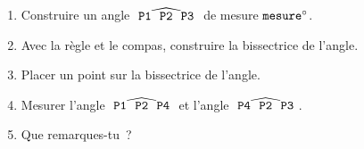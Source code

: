 \documentclass[exercice]{thedocument}%
\begin{document}
%
    \begin{enumerate}
        \item Construire un angle $\widehat{\mathspoint{\<P1;\<P2;\<P3;}}$ de mesure $\<mesure;^\circ$.
        \item Avec la règle et le compas, construire la bissectrice de l'angle.
        \item Placer un point  sur la bissectrice de l'angle.
        \item Mesurer l'angle $\widehat{\mathspoint{\<P1;\<P2;\<P4;}}$ et l'angle $\widehat{\mathspoint{\<P4;\<P2;\<P3;}}$.
        \item Que remarques-tu~?
    \end{enumerate}
\end{document}
